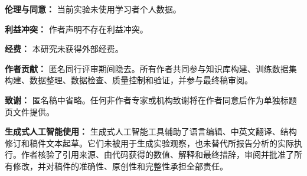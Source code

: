 \textbf{伦理与同意：} 当前实验未使用学习者个人数据。

\textbf{利益冲突：} 作者声明不存在利益冲突。

\textbf{经费：} 本研究未获得外部经费。

\textbf{作者贡献：} 匿名同行评审期间隐去。所有作者共同参与知识库构建、训练数据集构建、数据整理、数据检查、质量控制和验证，并参与最终稿审阅。

\textbf{致谢：} 匿名稿中省略。任何非作者专家或机构致谢将在作者同意后作为单独标题页文件提供。

\textbf{生成式人工智能使用：} 生成式人工智能工具辅助了语言编辑、中英文翻译、结构修订和稿件文本起草。它们未被用于生成实验观察，也未替代所报告分析的实际执行。作者核验了引用来源、由代码获得的数值、解释和最终措辞，审阅并批准了所有修改，并对稿件的准确性、原创性和完整性承担全部责任。
